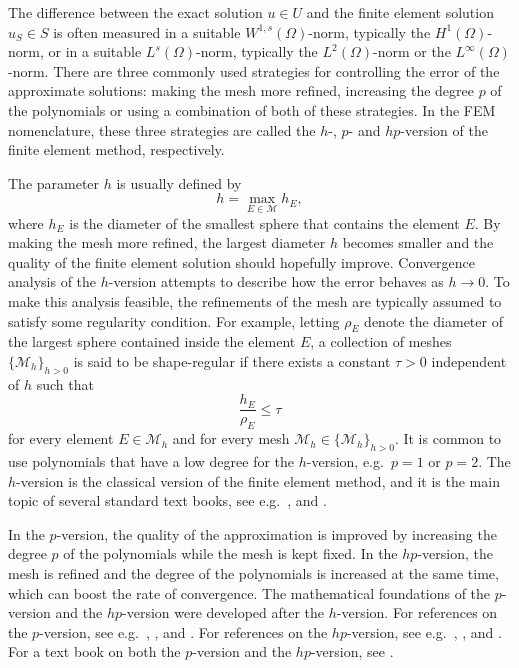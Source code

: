 \documentclass[english, 12pt, a4paper, sci, utf8, a-2b, online]{aaltothesis}
\theoremstyle{definition}
\theoremstyle{plain}
\numberwithin{equation}{section}
\begin{document}
The difference between the exact solution $u \in U$
and the finite element solution $u_S \in S$ is often measured
in a suitable $W^{1,s}(\Omega)$-norm, typically the $H^1(\Omega)$-norm,
or in a suitable $L^s(\Omega)$-norm, typically the $L^2(\Omega)$-norm or
the $L^{\infty}(\Omega)$-norm.
There are three commonly used strategies for controlling the error
of the approximate solutions: making the mesh more refined,
increasing the degree $p$ of the polynomials
or using a combination of both of these strategies.
In the FEM nomenclature,
these three strategies are called the $h$-, $p$- and $hp$-version
of the finite element method, respectively.

The parameter $h$ is usually defined by
\begin{equation*}
    h = \max_{E \in \mathcal{M}} h_E,
\end{equation*}
where $h_E$ is the diameter of the smallest sphere that contains the element $E$.
By making the mesh more refined, the largest diameter $h$
becomes smaller and the quality of the finite element solution should hopefully improve.
Convergence analysis of the $h$-version attempts to
describe how the error behaves as $h \to 0$.
To make this analysis feasible, the refinements of the mesh are typically
assumed to satisfy some regularity condition. For example, letting
$\rho_E$ denote the diameter of the largest sphere contained inside the element $E$,
a collection of meshes $\{ \mathcal{M}_h \}_{h > 0}$
is said to be shape-regular if there exists
a constant $\tau > 0$ independent of $h$ such that
\begin{equation*}
    \frac{h_E}{\rho_E} \leq \tau
\end{equation*}
for every element $E \in \mathcal{M}_h$
and for every mesh $\mathcal{M}_h \in \{ \mathcal{M}_h \}_{h > 0}$.
It is common to use polynomials that have a low degree for the $h$-version,
e.g.\ $p=1$ or $p=2$.
The $h$-version is the classical version of the finite element method,
and it is the main topic of several standard text books,
see e.g.\ \cite{ciarlet2002}, \cite{braess2007} and \cite{scottbrenner2007}.

In the $p$-version, the quality of the approximation is improved
by increasing the degree $p$ of the polynomials while the mesh is kept fixed.
In the $hp$-version, the mesh is refined and the degree of the polynomials is increased
at the same time, which can boost the rate of convergence.
The mathematical foundations of the $p$-version and the $hp$-version
were developed after the $h$-version.
For references on the $p$-version, see e.g.\
\cite{babuskaszabokatz1981}, \cite{dorr1984}, \cite{babuskasuri1987} and
\cite{szabo2004}.
For references on the $hp$-version, see e.g.\
\cite{babuskadorr1981}, \cite{guo1986}, \cite{babuskasuri1987hp} and
\cite{babuskasuri1994}.
For a text book on both the $p$-version and the $hp$-version, see \cite{schwab1998}.
\end{document}
